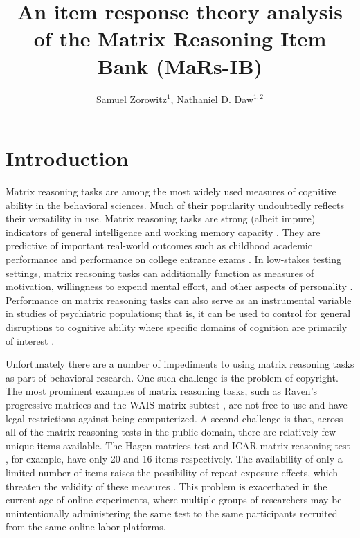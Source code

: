 \documentclass[a4paper,man,natbib]{apa6}
\title{An item response theory analysis of the Matrix Reasoning Item Bank (MaRs-IB)}
\author{Samuel Zorowitz$^1$, Nathaniel D. Daw$^{1,2}$}
\affiliation{$^1$Princeton Neuroscience Institute, Princeton University, USA\\$^2$Department of Psychology, Princeton University, USA}
\begin{document}
\maketitle

\section{Introduction}

Matrix reasoning tasks are among the most widely used measures of cognitive ability in the behavioral sciences. Much of their popularity undoubtedly reflects their versatility in use. Matrix reasoning tasks are strong (albeit impure) indicators of general intelligence \citep{gignac2015raven} and working memory capacity \citep{kane2004generality, unsworth2005working}. They are predictive of important real-world outcomes such as childhood academic performance \citep{roth2015intelligence} and performance on college entrance exams \citep{frey2004scholastic, koenig2008act}. In low-stakes testing settings, matrix reasoning tasks can additionally function as measures of motivation, willingness to expend mental effort, and other aspects of personality \citep{duckworth2011role, gignac2019maximum}. Performance on matrix reasoning tasks can also serve as an instrumental variable in studies of psychiatric populations; that is, it can be used to control for general disruptions to cognitive ability where specific domains of cognition are primarily of interest \citep{gillan2016characterizing, rouault2018psychiatric, moutoussis2021decision}.

Unfortunately there are a number of impediments to using matrix reasoning tasks as part of behavioral research. One such challenge is the problem of copyright. The most prominent examples of matrix reasoning tasks, such as Raven's progressive matrices \citep{raven2003raven} and the WAIS matrix subtest \citep{wechsler1999wechsler}, are not free to use and have legal restrictions against being computerized. A second challenge is that, across all of the matrix reasoning tests in the public domain, there are relatively few unique items available. The Hagen matrices test \citep{heydasch2014hagen} and ICAR matrix reasoning test \citep{condon2014international}, for example, have only 20 and 16 items respectively. The availability of only a limited number of items raises the possibility of repeat exposure effects, which threaten the validity of these measures  \citep{ng1974applicability, bors2003effect}. This problem is exacerbated in the current age of online experiments, where multiple groups of researchers may be unintentionally administering the same test to the same participants recruited from the same online labor platforms.
\end{document}
